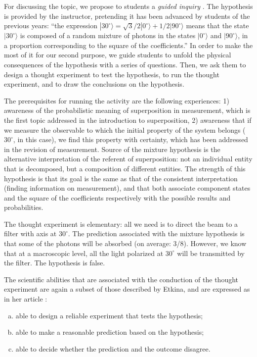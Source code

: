 \documentclass[twocolumn,secnumarabic,amssymb, nobibnotes, aps, prd, nofootinbib]{revtex4-2}
\begin{document}
For discussing the topic, we propose to students a \emph{guided inquiry} \cite{Llewellyn2012}. The hypothesis is provided by the instructor, pretending it has been advanced by students of the previous years: ``the expression $|30^{\circ}\rangle = \sqrt{3}/2|0^{\circ}\rangle + 1/2|90^{\circ}\rangle$ means that the state $|30^{\circ}\rangle$ is composed of a random mixture of photons in the states $|0^{\circ}\rangle$ and $|90^{\circ}\rangle$, in a proportion corresponding to the square of the coefficients.'' In order to make the most of it for our second purpose, we guide students to unfold the physical consequences of the hypothesis with a series of questions. Then, we ask them to design a thought experiment to test the hypothesis, to run the thought experiment, and to draw the conclusions on the hypothesis.

The prerequisites for running the activity are the following experiences: 1) awareness of the probabilistic meaning of superposition in measurement, which is the first topic addressed in the introduction to superposition, 2) awareness that if we measure the observable to which the initial property of the system belongs ($30^{\circ}$, in this case), we find this property with certainty, which has been addressed in the revision of measurement. Source of the mixture hypothesis is the alternative interpretation of the referent of superposition: not an individual entity that is decomposed, but a composition of different entities. The strength of this hypothesis is that its goal is the same as that of the consistent interpretation (finding information on measurement), and that both associate component states and the square of the coefficients respectively with the possible results and probabilities.

The thought experiment is elementary: all we need is to direct the beam to a filter with axis at $30^{\circ}$. The prediction associated with the mixture hypothesis is that some of the photons will be absorbed (on average: 3/8). However, we know that at a macroscopic level, all the light polarized at $30^{\circ}$ will be transmitted by the filter. The hypothesis is false.

The scientific abilities that are associated with the conduction of the thought experiment are again a subset of those described by Etkina, and are expressed as in her article \cite[Appendix B]{Etkina2015}:
\begin{enumerate}[a.]
\item able to design a reliable experiment that tests the hypothesis;
\item able to make a reasonable prediction based on the hypothesis;
\item able to decide whether the prediction and the outcome disagree.
\end{enumerate}
\end{document}
